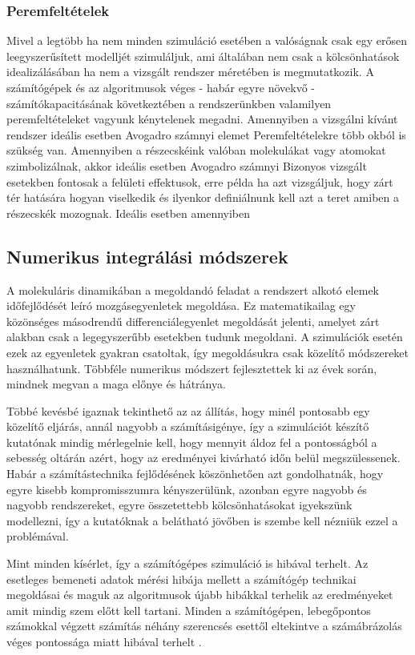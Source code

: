 \subsubsection*{Peremfeltételek}
Mivel a legtöbb ha nem minden szimuláció esetében a valóságnak csak egy erősen leegyszerűsített modelljét szimuláljuk, ami általában nem csak a kölcsönhatások idealizálásában ha nem a vizsgált rendszer méretében is megmutatkozik. A számítógépek és az algoritmusok véges - habár egyre növekvő - számítókapacitásának következtében a rendszerünkben valamilyen peremfeltételeket vagyunk kénytelenek megadni.
Amennyiben a vizsgálni kívánt rendszer ideális esetben Avogadro számnyi elemet 
Peremfeltételekre több okból is szükség van. Amennyiben a részecskéink valóban molekulákat vagy atomokat szimbolizálnak, akkor ideális esetben Avogadro számnyi 
Bizonyos vizsgált esetekben fontosak a felületi effektusok, erre példa ha azt vizsgáljuk, hogy zárt tér hatására hogyan viselkedik  és ilyenkor definiálnunk kell azt a teret amiben a részecskék mozognak. Ideális esetben amennyiben 


\subsection{Numerikus integrálási módszerek}
A molekuláris dinamikában a megoldandó feladat a rendszert alkotó elemek időfejlődését leíró mozgásegyenletek megoldása. Ez matematikailag egy közönséges másodrendű differenciálegyenlet megoldását jelenti, amelyet zárt alakban csak a legegyszerűbb esetekben tudunk megoldani. A szimulációk esetén ezek az egyenletek gyakran csatoltak, így megoldásukra csak közelítő módszereket használhatunk. Többféle numerikus módszert fejlesztettek ki az évek során, mindnek megvan a maga előnye és hátránya.

Többé kevésbé igaznak tekinthető az az állítás, hogy minél pontosabb egy közelítő eljárás, annál nagyobb a számításigénye, így a szimulációt készítő kutatónak mindig mérlegelnie kell, hogy mennyit áldoz fel a pontosságból a sebesség oltárán azért, hogy az eredményei kivárható időn belül megszülessenek. Habár a számítástechnika fejlődésének köszönhetően azt gondolhatnák, hogy egyre kisebb kompromisszumra kényszerülünk, azonban egyre nagyobb és nagyobb rendszereket, egyre összetettebb kölcsönhatásokat igyekszünk modellezni, így a kutatóknak a belátható jövőben is szembe kell nézniük ezzel a problémával.

Mint minden kísérlet, így a számítógépes szimuláció is hibával terhelt. Az esetleges bemeneti adatok mérési hibája mellett a számítógép technikai megoldásai és maguk az algoritmusok újabb hibákkal terhelik az eredményeket amit mindig szem előtt kell tartani. Minden a számítógépen, lebegőpontos számokkal végzett számítás néhány szerencsés esettől eltekintve a számábrázolás véges pontossága miatt hibával terhelt \cite{nummat_gisbert,nummat_vertse}. 

